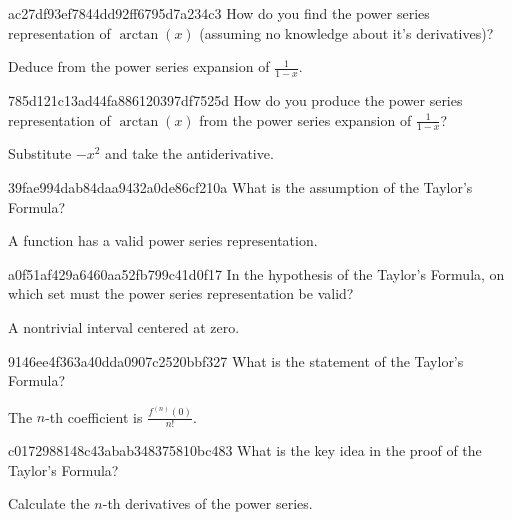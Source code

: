 \begin{note}{ac27df93ef7844dd92ff6795d7a234c3}
    How do you find the power series representation of \({ \arctan(x) }\) (assuming no knowledge about it's derivatives)?

    \begin{cloze}{1}
        Deduce from the power series expansion of \({ \frac{1}{1-x} }\).
    \end{cloze}
\end{note}

\begin{note}{785d121c13ad44fa886120397df7525d}
    How do you produce the power series representation of \({ \arctan(x) }\) from the power series expansion of \({ \frac{1}{1-x} }\)?

    \begin{cloze}{1}
        Substitute \({ -x^2 }\) and take the antiderivative.
    \end{cloze}
\end{note}

\begin{note}{39fae994dab84daa9432a0de86cf210a}
    What is the assumption of the Taylor's Formula?

    \begin{cloze}{1}
        A function has a valid power series representation.
    \end{cloze}
\end{note}

\begin{note}{a0f51af429a6460aa52fb799c41d0f17}
    In the hypothesis of the Taylor's Formula, on which set must the power series representation be valid?

    \begin{cloze}{1}
        A nontrivial interval centered at zero.
    \end{cloze}
\end{note}

\begin{note}{9146ee4f363a40dda0907c2520bbf327}
    What is the statement of the Taylor's Formula?

    \begin{cloze}{1}
        The \({ n }\)-th coefficient is \({ \frac{f^{(n)}(0)}{n!} }\).
    \end{cloze}
\end{note}

\begin{note}{c0172988148c43abab348375810bc483}
    What is the key idea in the proof of the Taylor's Formula?

    \begin{cloze}{1}
        Calculate the \({ n }\)-th derivatives of the power series.
    \end{cloze}
\end{note}

